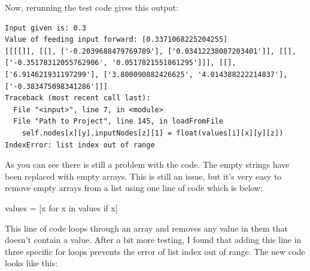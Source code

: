 \documentclass{report}
\begin{document}
\newpage
\noindent Now, rerunning the test code gives this output:
\begin{verbatim}
Input given is: 0.3
Value of feeding input forward: [0.3371068225204255]
[[[[]], [[], ['-0.2039688479769789'], ['0.03412238087203401']], [[],
['-0.35178312055762906', '0.0517821551861295']]], [[],
['6.914621931197299'], ['3.800090882426625', '4.014388222214837'],
['-0.383475098341286']]]
Traceback (most recent call last):
  File "<input>", line 7, in <module>
  File "Path to Project", line 145, in loadFromFile
    self.nodes[x][y].inputNodes[z][1] = float(values[i][x][y][z])
IndexError: list index out of range
\end{verbatim}
As you can see there is still a problem with the code. The empty strings have been replaced with empty arrays. This is still an issue, but it's very easy to remove empty arrays from a list using one line of code which is below:
\begin{python}
values = [x for x in values if x]
\end{python}
This line of code loops through an array and removes any value in them that doesn't contain a value. After a bit more testing, I found that adding this line in three specific for loops prevents the error of list index out of range. The new code looks like this:
\end{document}
